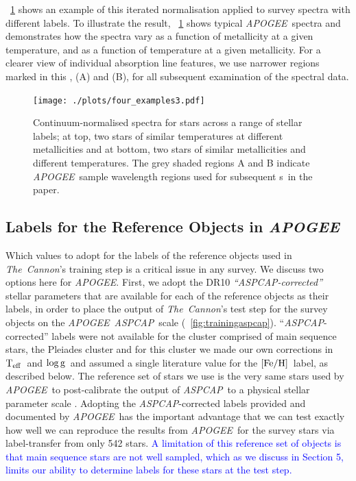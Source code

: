 \documentclass[12pt, preprint]{aastex}
\newcommand{\figurenames}{\figurename s}
\newcommand{\tc}{\textsl{The~Cannon}}
\newcommand{\apogee}{\textsl{APOGEE}}
\newcommand{\aspcap}{\textsl{ASPCAP}}
\newcommand{\teff}{\mbox{$\rm T_{eff}$}}
\newcommand{\feh}{\mbox{$\rm [Fe/H]$}}
\newcommand{\logg}{\mbox{$\rm \log g$}}
\begin{document}
\figurename~\ref{fig:norm} shows an example of this iterated normalisation applied to survey spectra with different labels. To illustrate the result, \figurename~\ref{fig:norm} shows typical \apogee\ spectra and demonstrates how the spectra 
vary as a function of metallicity at a given temperature, and as a function of temperature at a given metallicity. 
For a clearer view of individual absorption line features, we use narrower regions marked in this \figurename, (A) and (B), for all subsequent examination of the spectral data. 

\begin{figure}[h!]
  \texttt{[image: ./plots/four\_examples3.pdf]}
\caption{Continuum-normalised spectra for stars across a range of stellar labels; at top, two stars of similar temperatures at different metallicities and at bottom, two stars of similar metallicities and different temperatures. The grey shaded regions A and B indicate \apogee\ sample wavelength regions used for subsequent \figurenames\ in the paper.}
\label{fig:norm}
\end{figure}



\subsection{Labels for the Reference Objects in \apogee}
\label{sec:ApogeeRefLabels}

Which values to adopt for the labels of the reference objects used in \tc 's training step is a critical issue
in any survey. We discuss two options here for \apogee . 
First, we adopt the DR10 \textit{``\aspcap-corrected''} stellar parameters \citep{Meszaros2013} that are available for each of the reference objects as their labels, in order to place the output of \tc 's test step for the survey objects on the \apogee\ \aspcap\ scale (\figurename~\ref{fig:trainingaspcap}). ``\aspcap-corrected'' labels were not available for the cluster comprised of main sequence stars, the Pleiades cluster and for this cluster we made our own corrections in \teff\ and \logg\ and assumed a single literature value for the \feh\ label, as described below. 
The reference set of stars we use is the very same stars used by \apogee\ to post-calibrate the output of \aspcap\ to a physical stellar parameter scale \citep{Meszaros2013}.
Adopting the \aspcap-corrected labels provided and documented by \apogee\ has the important advantage 
that we can test exactly how well we can reproduce the results from \apogee\ for the survey stars via label-transfer from only 542 stars. \textcolor{blue}{A limitation of this reference set of objects is that main sequence stars are not well sampled, which as we discuss in Section 5, limits our ability to determine labels for these stars at the test step. }
\end{document}

